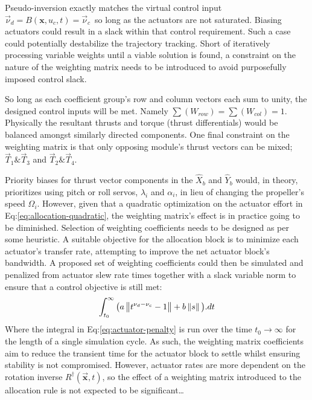 \par
Pseudo-inversion exactly matches the virtual control input $\vec{\nu}_d=B(\mathbf{x},u_c,t)=\vec{\nu}_c$~so long as the actuators are not saturated. Biasing actuators could result in a slack within that control requirement. Such a case could potentially destabilize the trajectory tracking. Short of iteratively processing variable weights until a viable solution is found, a constraint on the nature of the weighting matrix needs to be introduced to avoid purposefully imposed control slack.
\par
So long as each coefficient group's row and column vectors each sum to unity, the designed control inputs will be met. Namely $\sum (W_{row})=\sum (W_{col}) = 1$. Physically the resultant thrusts and torque (thrust differentials) would be balanced amongst similarly directed components. One final constraint on the weighting matrix is that only opposing module's thrust vectors can be mixed; $\vec{T}_1\text{\&}\vec{T}_3$ and $\vec{T}_2\text{\&}\vec{T}_4$.
\par
Priority biases for thrust vector components in the $\hat{X}_{b}$ and $\hat{Y}_{b}$ would, in theory, prioritizes using pitch or roll servos, $\lambda_i$ and $\alpha_i$, in lieu of changing the propeller's speed $\Omega_i$. However, given that a quadratic optimization on the actuator effort in Eq:\ref{eq:allocation-quadratic}, the weighting matrix's effect is in practice going to be diminished. Selection of weighting coefficients needs to be designed as per some heuristic. A suitable objective for the allocation block is to minimize each actuator's transfer rate, attempting to improve the net actuator block's bandwidth. A proposed set of weighting coefficients could then be simulated and penalized from actuator slew rate times together with a slack variable norm to ensure that a control objective is still met:
\begin{equation}\label{eq:actuator-penalty}
\int_{t_0}^{\infty} \big(a\left\lVert t^{\nu_d-\nu_c}-1\right\rVert+b\left\lVert s\right\rVert\big).dt
\end{equation}
Where the integral in Eq:\ref{eq:actuator-penalty} is run over the time $t_0\rightarrow\infty$ for the length of a single simulation cycle. As such, the weighting matrix coefficients aim to reduce the transient time for the actuator block to settle whilst ensuring stability is not compromised. However, actuator rates are more dependent on the rotation inverse $R^\dagger(\vec{\mathbf{x}},t)$, so the effect of a weighting matrix introduced to the allocation rule is not expected to be significant\ldots